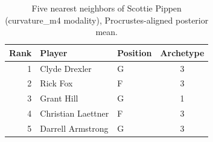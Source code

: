 \begin{table}[htbp]
  \centering\small
  \begin{tabular}{rllc}
    \toprule
    Rank & Player & Position & Archetype \\
    \midrule
    1 & Clyde Drexler & G & 3 \\
    2 & Rick Fox & F & 3 \\
    3 & Grant Hill & G & 1 \\
    4 & Christian Laettner & F & 3 \\
    5 & Darrell Armstrong & G & 3 \\
    \bottomrule
  \end{tabular}
  \caption{Five nearest neighbors of Scottie Pippen (curvature_m4 modality), Procrustes-aligned posterior mean.}
  \label{tab:Scottie_Pippen_neighbors_curvature_m4}
\end{table}


